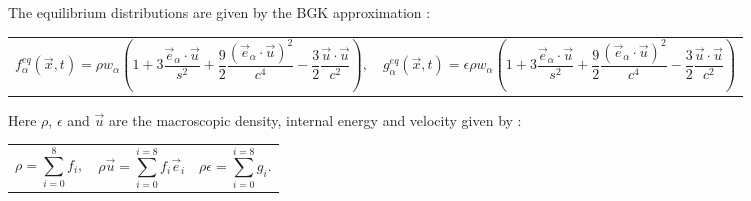\documentclass{article}
\begin{document}
\noindent The equilibrium distributions are given by the BGK approximation \cite{qian1992lattice, rothman2004lattice}:
\newline
\begin{tabularx}{\textwidth}{XX}
\begin{equation}
	f^{eq}_{\alpha}(\vec{x}, t)  = \rho w_{\alpha} (1 + 3 \frac{\vec{e}_{\alpha} \cdot \vec{u}}{s^2} + \frac{9}{2} \frac{(\vec{e}_{\alpha} \cdot \vec{u}  )^2}{c^4} - \frac{3}{2} \frac{\vec{u} \cdot \vec{u}}{c^2}  ),
\end{equation}
    &
\begin{equation}
	g^{eq}_{\alpha}(\vec{x}, t)  = \epsilon \rho w_{\alpha} (1 + 3 \frac{\vec{e}_{\alpha} \cdot \vec{u}}{s^2} + \frac{9}{2} \frac{(\vec{e}_{\alpha} \cdot \vec{u}  )^2}{c^4} - \frac{3}{2} \frac{\vec{u} \cdot \vec{u}}{c^2}  )
\end{equation}
\end{tabularx}\par

\noindent Here $\rho$, $\epsilon$ and $\vec{u}$ are the macroscopic density, internal energy and velocity given by \cite{mora2017simulation}:
\newline
\begin{tabularx}{\textwidth}{XXX}
\begin{equation}
	\rho = \sum_{i=0}^{8} f_{i},
	\label{LBM rho}
\end{equation}
    &
\begin{equation}
	\rho \vec{u} = \sum_{i=0}^{i=8} f_{i} \vec{e}_{i}
	\label{LBM u}
\end{equation}
	&
\begin{equation}
	\rho \epsilon = \sum_{i=0}^{i=8} g_{i}.
	\label{LBM ep}
\end{equation}
\end{tabularx}\par
\end{document}
